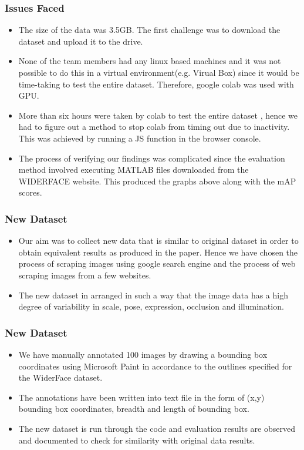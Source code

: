 \documentclass[11pt]{beamer}
\begin{document}
\begin{frame}
\frametitle{Issues Faced}
\begin{itemize}
\item The size of the data was 3.5GB. The first challenge was to download the dataset and upload it to the drive.
\item None of the team members had any linux based machines and it was not possible to do this in a virtual environment(e.g. Virual Box) since it would be time-taking to test the entire dataset. Therefore, google colab was used with GPU.
\item More than six hours were taken by colab to test the entire dataset , hence we had to figure out a method to stop colab from timing out due to inactivity. This was achieved by running a JS function in the browser console. 
\item The process of verifying our findings was complicated since the evaluation method involved executing MATLAB files downloaded from the WIDERFACE website. This produced the graphs above along with the mAP scores. 
\end{itemize}
\end{frame}
\begin{frame}
	\frametitle{New Dataset}
	\begin{itemize}
\item Our aim was to collect new data that is similar to original dataset in order to obtain equivalent results as produced in the paper. Hence we have chosen the process of scraping images using google search engine and the process of web scraping images from a few websites.
\item The new dataset in arranged in such a way that the image data has a high degree of variability in scale, pose, expression, occlusion and illumination.
	\end{itemize}
\end{frame} 
\begin{frame}
	\frametitle{New Dataset}
\begin{itemize}
	
\item We have manually annotated 100 images by drawing a bounding box coordinates using Microsoft Paint in accordance to the outlines specified for the WiderFace dataset. 
\item The annotations have been written into text file in the form of (x,y) bounding box coordinates, breadth and length of bounding box. 
\item The new dataset is run through the code and evaluation results are observed and documented to check for similarity with original data results.

	\end{itemize}
\end{frame} 
\end{document}
